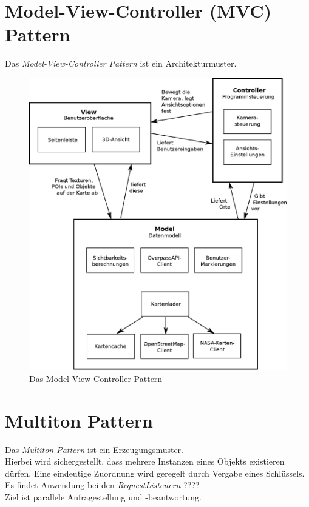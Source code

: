 \documentclass[10pt]{scrreprt}
\begin{document}
\section{Model-View-Controller (MVC) Pattern}
Das \textit{Model-View-Controller Pattern} ist ein Architekturmuster. \\
\begin{figure}[ht]
\begin{centering}
\includegraphics[scale=0.5]{ModelViewController.eps}
\caption{Das Model-View-Controller Pattern}
\end{centering}
\end{figure}



\section{Multiton Pattern}
Das \textit{Multiton Pattern} ist ein Erzeugungsmuster. \\ Hierbei wird sichergestellt, dass mehrere Instanzen eines Objekts existieren dürfen. Eine eindeutige Zuordnung wird geregelt durch Vergabe eines Schlüssels. \\ Es findet Anwendung bei den \textit{RequestListenern} ???? \\ Ziel ist parallele Anfragestellung und -beantwortung.
\end{document}
